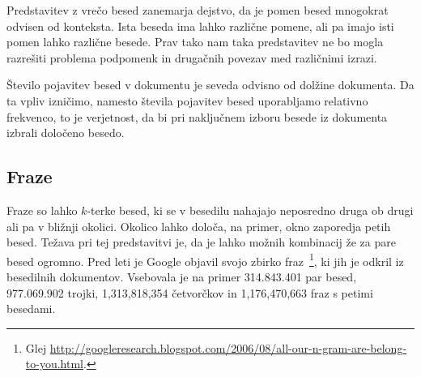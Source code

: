 Predstavitev z vrečo besed zanemarja dejstvo, da je pomen besed
mnogokrat odvisen od konteksta. Ista beseda ima lahko različne pomene,
ali pa imajo isti pomen lahko različne besede. Prav tako nam taka
predstavitev ne bo mogla razrešiti problema podpomenk in drugačnih
povezav med različnimi izrazi.

Število pojavitev besed v dokumentu je seveda odvisno od dolžine
dokumenta. Da ta vpliv izničimo, namesto števila pojavitev besed
uporabljamo relativno frekvenco, to je verjetnost, da bi pri
naključnem izboru besede iz dokumenta izbrali določeno besedo.

\subsection{Fraze}

Fraze so lahko $k$-terke besed, ki se v besedilu nahajajo neposredno
druga ob drugi ali pa v bližnji okolici. Okolico lahko določa, na
primer, okno zaporedja petih besed. Težava pri tej predstavitvi je, da
je lahko možnih kombinacij že za pare besed ogromno. Pred leti je
Google objavil svojo zbirko fraz~\footnote{Glej
  \url{http://googleresearch.blogspot.com/2006/08/all-our-n-gram-are-belong-to-you.html}.},
ki jih je odkril iz besedilnih dokumentov. Vsebovala je na primer
314.843.401 par besed, 977.069.902 trojki, 1,313,818,354 četvorčkov in
1,176,470,663 fraz s petimi besedami.

